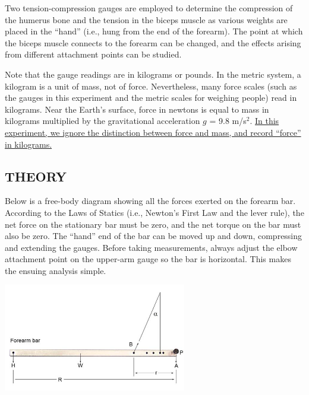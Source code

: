 Two tension-compression gauges are employed to determine the compression of the humerus bone and the tension in the biceps muscle as various weights are placed in the ``hand'' (i.e., hung from the end of the forearm).  The point at which the biceps muscle connects to the forearm can be changed, and the effects arising from different attachment points can be studied.

Note that the gauge readings are in kilograms or pounds.  In the metric system, a kilogram is a unit of mass, not of force.  Nevertheless, many force scales (such as the gauges in this experiment and the metric scales for weighing people) read in kilograms.  Near the Earth's surface, force in newtons is equal to mass in kilograms multiplied by the gravitational acceleration \(g\) = 9.8 m/s\(^{2}\).  \ul{In this experiment, we ignore the distinction between force and mass, and record ``force'' in kilograms.}

\subsection*{THEORY}

Below is a free-body diagram showing all the forces exerted on the forearm bar.  According to the Laws of Statics (i.e., Newton's First Law and the lever rule), the net force on the stationary bar must be zero, and the net torque on the bar must also be zero.  The ``hand'' end of the bar can be moved up and down, compressing and extending the gauges.  Before taking measurements, always adjust the elbow attachment point on the upper-arm gauge so the bar is horizontal.  This makes the ensuing analysis simple.
\begin{center} \includegraphics*[width=0.6\textwidth]{imgs/6labs/6Alab/6Aexp6/6A_6_arm.jpg} \end{center}

